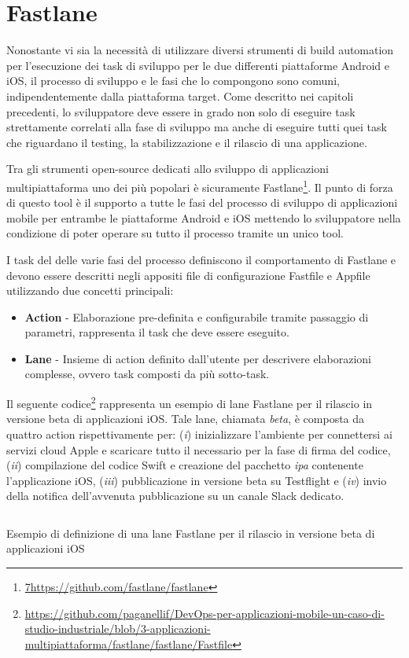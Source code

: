 \section{Fastlane}
\label{fastlane-sec}
Nonostante vi sia la necessità di utilizzare diversi strumenti di build automation per l'esecuzione dei task di sviluppo per le due differenti piattaforme Android e iOS, il processo di sviluppo e le fasi che lo compongono sono comuni, indipendentemente dalla piattaforma target. Come descritto nei capitoli precedenti, lo sviluppatore deve essere in grado non solo di eseguire task strettamente correlati alla fase di sviluppo ma anche di eseguire tutti quei task che riguardano il testing, la stabilizzazione e il rilascio di una applicazione.

Tra gli strumenti open-source dedicati allo sviluppo di applicazioni multipiattaforma uno dei più popolari è sicuramente Fastlane\footnote{\href{7https://github.com/fastlane/fastlane}{7https://github.com/fastlane/fastlane}}. Il punto di forza di questo tool è il supporto a tutte le fasi del processo di sviluppo di applicazioni mobile per entrambe le piattaforme Android e iOS mettendo lo sviluppatore nella condizione di poter operare su tutto il processo tramite un unico tool.

I task del delle varie fasi del processo definiscono il comportamento di Fastlane e devono essere descritti negli appositi file di configurazione Fastfile e Appfile utilizzando due concetti principali:

\begin{itemize}
    \item \textbf{Action} - Elaborazione pre-definita e configurabile tramite passaggio di parametri, rappresenta il task che deve essere eseguito.
    \item \textbf{Lane} - Insieme di action definito dall'utente per descrivere elaborazioni complesse, ovvero task composti da più sotto-task.
\end{itemize}

Il seguente codice\footnote{\href{https://github.com/paganellif/DevOps-per-applicazioni-mobile-un-caso-di-studio-industriale/blob/3-applicazioni-multipiattaforma/fastlane/fastlane/Fastfile}{https://github.com/paganellif/DevOps-per-applicazioni-mobile-un-caso-di-studio-industriale/blob/3-applicazioni-multipiattaforma/fastlane/fastlane/Fastfile}} rappresenta un esempio di lane Fastlane per il rilascio in versione beta di applicazioni iOS. Tale lane, chiamata \textit{beta}, è composta da quattro action rispettivamente per: (\textit{i}) inizializzare l'ambiente per connettersi ai servizi cloud Apple e scaricare tutto il necessario per la fase di firma del codice, (\textit{ii}) compilazione del codice Swift e creazione del pacchetto \textit{ipa} contenente l'applicazione iOS, (\textit{iii}) pubblicazione in versione beta su Testflight e (\textit{iv}) invio della notifica dell'avvenuta pubblicazione su un canale Slack dedicato.

\begin{listing}[H]
    \inputminted{ruby}{code/4-fastlane}
    \caption{Esempio di definizione di una lane Fastlane per il rilascio in versione beta di applicazioni iOS}
\end{listing}